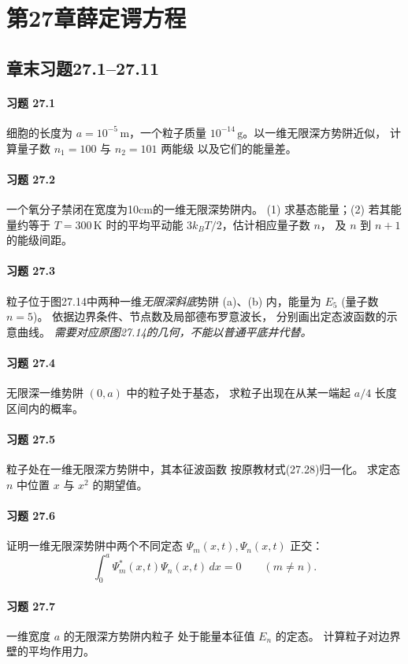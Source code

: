 \section*{第27章\quad 薛定谔方程}
\subsection*{章末习题27.1--27.11}
\paragraph{习题 27.1}
细胞的长度为 \(a=10^{-5}\,\mathrm m\)，一个粒子质量
\(10^{-14}\,\mathrm g\)。以一维无限深方势阱近似，
计算量子数 \(n_1=100\) 与 \(n_2=101\) 两能级
以及它们的能量差。
\paragraph{习题 27.2}
一个氧分子禁闭在宽度为10cm的一维无限深势阱内。
(1) 求基态能量；(2) 若其能量约等于
\(T=300\,\mathrm K\) 时的平均平动能
\(3k_BT/2\)，估计相应量子数 \(n\)，
及 \(n\) 到 \(n+1\) 的能级间距。
\paragraph{习题 27.3}
粒子位于图27.14中两种一维\emph{无限深斜底}势阱
(a)、(b) 内，能量为 \(E_5\) (量子数 \(n=5\))。
依据边界条件、节点数及局部德布罗意波长，
分别画出定态波函数的示意曲线。
\textit{需要对应原图27.14的几何，不能以普通平底井代替。}
\paragraph{习题 27.4}
无限深一维势阱 \((0,a)\) 中的粒子处于基态，
求粒子出现在从某一端起 \(a/4\) 长度区间内的概率。
\paragraph{习题 27.5}
粒子处在一维无限深方势阱中，其本征波函数
按原教材式(27.28)归一化。
求定态 \(n\) 中位置 \(x\) 与 \(x^2\) 的期望值。
\paragraph{习题 27.6}
证明一维无限深势阱中两个不同定态
\(\Psi_m(x,t),\Psi_n(x,t)\) 正交：
\[
\int_0^a \Psi_m^*(x,t)\Psi_n(x,t)\,dx=0
\qquad(m\ne n).
\]
\paragraph{习题 27.7}
一维宽度 \(a\) 的无限深方势阱内粒子
处于能量本征值 \(E_n\) 的定态。
计算粒子对边界壁的平均作用力。
